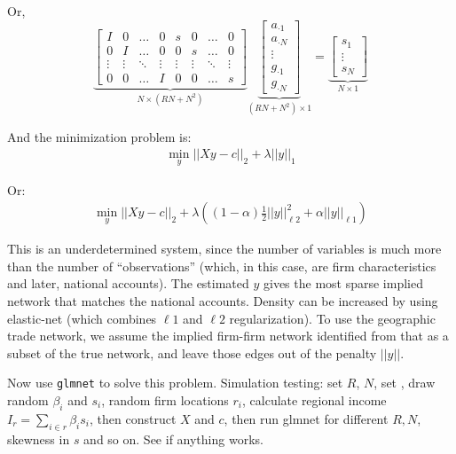 \documentclass[11pt]{article}
\begin{document}
Or,
\[
\underbrace{\begin{bmatrix}
    I & 0 &\dots  & 0 & s & 0 & \dots & 0\\
    0 & I &\dots  & 0 & 0 & s &\dots  & 0\\
    \vdots & \vdots & \ddots & \vdots & \vdots & \vdots & \ddots & \vdots \\
    0 & 0 & \dots  & I & 0 & 0 &\dots  & s
\end{bmatrix}}_{N \times (RN+N^2)}
\underbrace{\begin{bmatrix}
	a_{\cdot 1} \\
	a_{\cdot N} \\
	\vdots \\
	g_{\cdot 1} \\
	g_{\cdot N} 	
\end{bmatrix}}_{(RN+N^2) \times 1}
=
\underbrace{\begin{bmatrix}
	s_1 \\
	\vdots \\
	s_{N} 	
\end{bmatrix}}_{N\times 1}
\]

And the minimization problem is:
\begin{gather}
\min_y || X y - c||_2 + \lambda || y ||_1
\end{gather}

Or:
\begin{gather}
\min_y || X y - c||_2 + \lambda \left( (1-\alpha) \frac{1}{2} || y ||^2_{\ell 2} + \alpha || y ||_{\ell 1} \right)
\end{gather}


This is an underdetermined system, since the number of variables is much more than the number of ``observations'' (which, in this case, are firm characteristics and later, national accounts). The estimated $y$ gives the most sparse implied network that matches the national accounts. Density can be increased by using elastic-net (which combines $\ell 1$ and $\ell 2$ regularization).  To use the geographic trade network, we assume the implied firm-firm network identified from that as a subset of the true network, and leave those edges out of the penalty $||y||$.

Now use \texttt{glmnet} to solve this problem. Simulation testing: set $R$, $N$, set , draw random $\beta_i$ and $s_i$, random firm locations $r_i$, calculate regional income $I_r = \sum_{i \in r} \beta_i s_i$, then construct $X$ and $c$, then run glmnet for different $R,N$, skewness in $s$ and so on. See if anything works.
\end{document}
